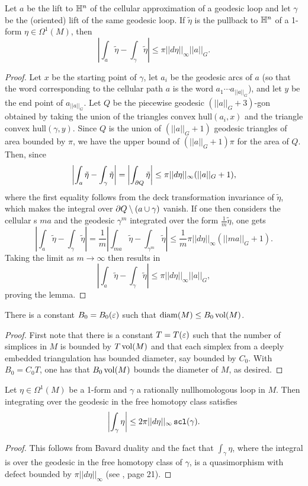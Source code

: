 \begin{lem} \label{lem:5.2}Let $a$ be the lift to $\mathbb H^n$ of the cellular approximation of a geodesic loop and let $\gamma$ be the (oriented) lift of the same geodesic loop. If $\tilde \eta$ is the pullback to $\mathbb H^n$ of a 1-form $\eta\in \Omega^1(M)$, then $$\left|\int_{a}\tilde\eta - \int_{\gamma}\tilde \eta\right| \leq \pi||d\eta||_{\infty}||a||_G.$$ \end{lem}
\begin{proof}
Let $x$ be the starting point of $\gamma$, let $a_i$ be the geodesic arcs of $a$ (so that the word corresponding to the cellular path $a$ is the word $a_1\cdots a_{||a||_G}$), and let $y$ be the end point of $a_{||a||_G}$. Let $Q$ be the piecewise geodesic $(||a||_G+3)$-gon obtained by taking the union of the triangles $\text{convex hull}(a_i,x)$ and the triangle $\text{convex hull}(\gamma,y)$. Since $Q$ is the union of $(||a||_G + 1)$ geodesic triangles of area bounded by $\pi$, we have the upper bound of $(||a||_G+1)\pi$ for the area of $Q$.
Then, since  $$
\left|\int_a\tilde\eta - \int_{\gamma}\tilde\eta\right| = \left|\int_{\partial Q} \tilde\eta\right|  \leq \pi||d\eta||_{\infty}(||a||_G+1),$$ where the first equality follows from the deck transformation invariance of $\tilde \eta$, which makes the integral over $\partial Q\setminus(a\cup\gamma)$ vanish.
If one then considers the cellular
s $ma$ and the geodesic $\gamma^m$ integrated over the form $\frac{1}{m}\tilde\eta$, one gets
$$ \left|\int_a\tilde\eta - \int_{\gamma}\tilde\eta\right| = \frac{1}{m}\left|\int_{ma}\tilde\eta - \int_{\gamma^m}\tilde \eta\right|\leq \frac{1}{m}\pi||d\eta||_{\infty}(||ma||_G+1).$$
Taking the limit as $m\to\infty$ then results in  $$\left|\int_{a}\tilde\eta - \int_{\gamma} \tilde\eta\right|\leq\pi||d\eta||_{\infty}||a||_G,$$ proving the lemma.
\end{proof}

\begin{lem}\label{lem:5.3}
There is a constant $B_0 = B_0(\varepsilon)$ such that $\operatorname{diam}(M)\leq B_0\operatorname{vol}(M)$.
\end{lem}
\begin{proof}
	First note that there is a constant $T = T(\varepsilon)$ such that the number of simplices in $M$ is bounded by $T\operatorname{vol}(M)$ and that each simplex from a deeply embedded triangulation has bounded diameter, say bounded by $C_0$. With $B_0 = C_0T$, one has that $B_0\operatorname{vol}(M)$ bounds the diameter of $M$, as desired.
\end{proof}

\begin{lem}\label{lem:5.4}
Let $\eta\in\Omega^1(M)$ be a 1-form and $\gamma$ a rationally nullhomologous loop in $M$. Then integrating over the geodesic in the free homotopy class satisfies $$\left|\int_{\gamma}\eta \right|\leq 2 \pi||d\eta||_{\infty}\operatorname{{\tt{scl}}}(\gamma).$$
\end{lem}
\begin{proof}

This follows from Bavard duality and the fact that $\int_{\gamma}\eta$, where the integral is over the geodesic in the free homotopy class of $\gamma$, is a quasimorphism with defect bounded by $\pi||d\eta||_{\infty}$ (see \cite{Calegari}, page 21).
\end{proof}

